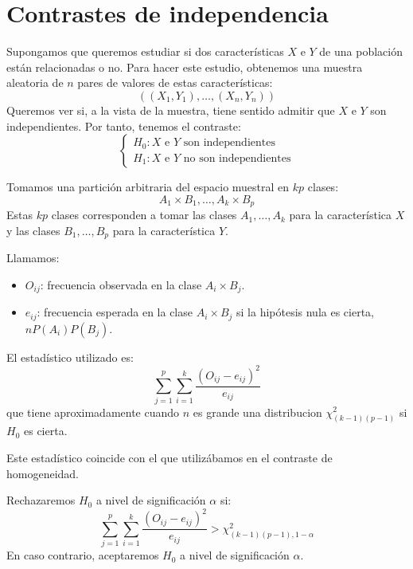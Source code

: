 
\section{Contrastes de independencia}
Supongamos que queremos estudiar si dos características $X$ e $Y$ de una población están relacionadas o no.
Para hacer este estudio, obtenemos una muestra aleatoria de $n$ pares de valores de estas características:
$$((X_1, Y_1), \dots, (X_n, Y_n))$$
Queremos ver si, a la vista de la muestra, tiene sentido admitir que $X$ e $Y$ son independientes.
Por tanto, tenemos el contraste:
$$\begin{cases}
        H_0: X \text{ e } Y \text{ son independientes} \\
        H_1: X \text{ e } Y \text{ no son independientes}
    \end{cases}$$

Tomamos una partición arbitraria del espacio muestral en $kp$ clases:
$$A_1 \times B_1, \dots, A_k \times B_p$$
Estas $kp$ clases corresponden a tomar las clases $A_1, \dots, A_k$ para la característica $X$ y las clases $B_1, \dots, B_p$ para la característica $Y$.

Llamamos:
\begin{itemize}
    \item $O_{ij}$: frecuencia observada en la clase $A_i \times B_j$.
    \item $e_{ij}$: frecuencia esperada en la clase $A_i \times B_j$ si la hipótesis nula es cierta, $nP(A_i)P(B_j)$.
\end{itemize}

El estadístico utilizado es:
$$\sum_{j=1}^p \sum_{i=1}^k \frac{(O_{ij}-e_{ij})^2}{e_{ij}}$$
que tiene aproximadamente cuando $n$ es grande una distribucion $\chi^2_{(k-1)(p-1)}$ si $H_0$ es cierta.

\begin{remark}
    Este estadístico coincide con el que utilizábamos en el contraste de homogeneidad.
\end{remark}

Rechazaremos $H_0$ a nivel de significación $\alpha$ si:
$$\sum_{j=1}^p \sum_{i=1}^k \frac{(O_{ij}-e_{ij})^2}{e_{ij}} > \chi^2_{(k-1)(p-1), 1-\alpha}$$
En caso contrario, aceptaremos $H_0$ a nivel de significación $\alpha$.

